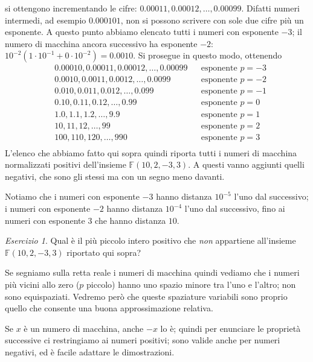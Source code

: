 \documentclass[a4paper]{report}
\theoremstyle{definiton}
\theoremstyle{remark}
\newtheorem{esercizio}[theorem]{Esercizio}
\begin{document}
si ottengono incrementando le cifre: $0.00011, 0.00012, \dots, 0.00099$. Difatti numeri intermedi, ad esempio $0.000101$, non si possono scrivere con sole due cifre più un esponente. A questo punto abbiamo elencato tutti i numeri con esponente $-3$; il numero di macchina ancora successivo ha esponente $-2$: $10^{-2}(1 \cdot 10^{-1} + 0 \cdot 10^{-2}) = 0.0010$. Si prosegue in questo modo, ottenendo
\begin{align*}
    &0.00010, 0.00011, 0.00012, \dots, 0.00099 & & \text{esponente $p=-3$}\\
    &0.0010, 0.0011, 0.0012, \dots, 0.0099 & & \text{esponente $p=-2$}\\
    &0.010, 0.011, 0.012, \dots, 0.099 & & \text{esponente $p=-1$}\\
    &0.10, 0.11, 0.12, \dots, 0.99 & & \text{esponente $p=0$}\\
    &1.0, 1.1, 1.2, \dots, 9.9 & & \text{esponente $p=1$}\\
    &10, 11, 12, \dots, 99 & & \text{esponente $p=2$}\\
    &100, 110, 120, \dots, 990 & & \text{esponente $p=3$}\\
\end{align*}
L'elenco che abbiamo fatto qui sopra quindi riporta tutti i numeri di macchina normalizzati positivi dell'insieme $\mathbb{F}(10, 2, -3, 3)$. A questi vanno aggiunti quelli negativi, che sono gli stessi ma con un segno meno davanti.

Notiamo che i numeri con esponente $-3$ hanno distanza $10^{-5}$ l'uno dal successivo; i numeri con esponente $-2$ hanno distanza $10^{-4}$ l'uno dal successivo, fino ai numeri con esponente $3$ che hanno distanza $10$.

\begin{esercizio}
    Qual è il più piccolo intero positivo che \emph{non} appartiene all'insieme $\mathbb{F}(10, 2, -3, 3)$ riportato qui sopra?
\end{esercizio}
    
Se segniamo sulla retta reale i numeri di macchina quindi vediamo che i numeri più vicini allo zero ($p$ piccolo) hanno uno spazio minore tra l'uno e l'altro; non sono equispaziati. Vedremo però che queste spaziature variabili sono proprio quello che consente una buona approssimazione relativa.

Se $x$ è un numero di macchina, anche $-x$ lo è; quindi per enunciare le proprietà successive ci restringiamo ai numeri positivi; sono valide anche per numeri negativi, ed è facile adattare le dimostrazioni.
\end{document}
